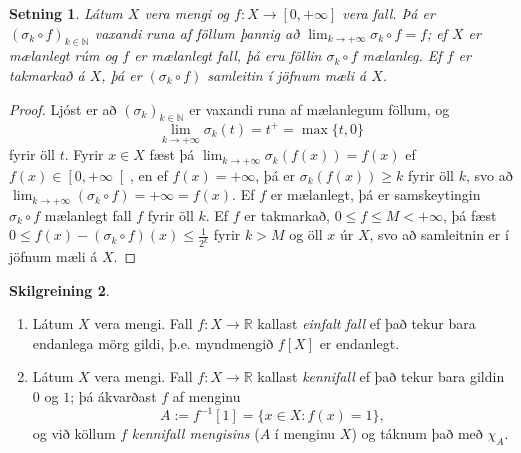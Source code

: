 \documentclass[a4paper,icelandic,11pt]{book}
\theoremstyle{plain}      \newtheorem{setn}{Setning}[chapter]
\theoremstyle{definition} \newtheorem{skilgr}[setn]{Skilgreining}
\theoremstyle{remark}     \newtheorem*{ath}{Athugasemd}
\newcommand{\R}{\mathbb R}
\newcommand{\N}{\mathbb N}
\begin{document}
\begin{setn}
  Látum $X$ vera mengi og $f:X\to[0,+\infty]$ vera fall. Þá er
  $(\sigma_{k}\circ f)_{k\in\N}$ vaxandi runa af föllum þannig að
  $\lim_{k\to+\infty}\sigma_{k}\circ f = f$; ef $X$ er mælanlegt rúm
  og $f$ er mælanlegt fall, þá eru föllin $\sigma_{k}\circ f$
  mælanleg. Ef $f$ er takmarkað á $X$, þá er $(\sigma_{k}\circ f)$
  samleitin í jöfnum mæli á $X$.
\end{setn}
\begin{proof}
  Ljóst er að $(\sigma_{k})_{k\in\N}$ er vaxandi runa af mælanlegum
  föllum, og
  \[
  \lim_{k\to+\infty}\sigma_{k}(t)
  = t^{+}
  = \max\{t,0\}
  \]
  fyrir öll $t$. Fyrir $x\in X$ fæst þá
  $\lim_{k\to+\infty}\sigma_{k}(f(x))=f(x)$ ef
  $f(x)\in\left[0,+\infty\right[$, en ef $f(x)=+\infty$, þá er
  $\sigma_{k}(f(x))\ge k$ fyrir öll $k$, svo að
  $\lim_{k\to+\infty}(\sigma_{k}\circ f)=+\infty=f(x)$. Ef $f$ er
  mælanlegt, þá er samskeytingin $\sigma_{k}\circ f$ mælanlegt fall
  $f$ fyrir öll $k$. Ef $f$ er takmarkað, $0\le f\le M < +\infty$, þá
  fæst $0\le f(x)-(\sigma_{k}\circ f)(x)\le\frac{1}{2^{k}}$ fyrir $k>M$
  og öll $x$ úr $X$, svo að samleitnin er í jöfnum mæli á $X$.
\end{proof}
\begin{skilgr}
  \begin{enumerate}[(1)]
  \item Látum $X$ vera mengi. Fall $f:X\to\R$ kallast \emph{einfalt
      fall} ef það tekur bara endanlega mörg
    gildi, þ.e. myndmengið $f[X]$ er endanlegt.
  \item Látum $X$ vera mengi. Fall $f:X\to\R$ kallast
    \emph{kennifall} ef það tekur bara gildin $0$ og
    $1$; þá ákvarðast $f$ af menginu
    \[
    A
    := f^{-1}[1]
    = \{ x\in X : f(x) = 1 \},
    \]
    og við köllum $f$ \emph{kennifall
      mengisins} ($A$ í menginu $X$) og táknum
    það með $\chi_{A}$.
  \end{enumerate}
\end{skilgr}
\end{document}
